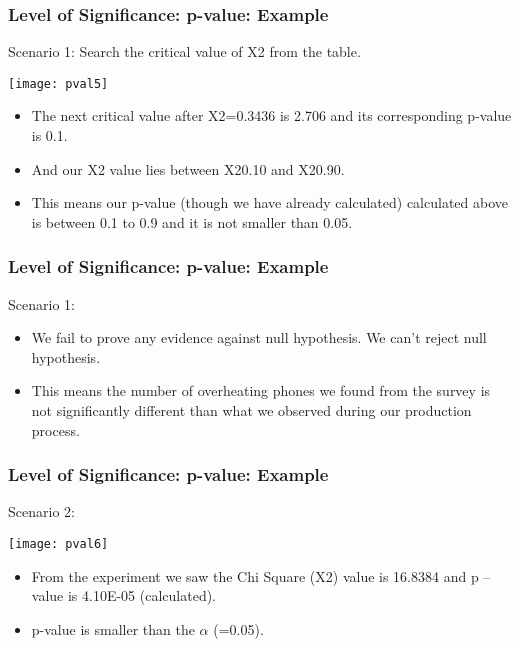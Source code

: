 \begin{frame}[fragile]\frametitle{Level of Significance: p-value: Example}
Scenario 1:
Search the critical value of X2 from the table. 
\begin{center}
\texttt{[image: pval5]}
\end{center}

\begin{itemize}
\item The next critical value after X2=0.3436 is 2.706 and its corresponding p-value is 0.1. 
\item And our X2 value lies between X20.10 and X20.90. 
\item This means our p-value (though we have already calculated) calculated above is between 0.1 to 0.9 and it is not smaller than 0.05.
\end{itemize}
\end{frame}

\begin{frame}[fragile]\frametitle{Level of Significance: p-value: Example}
Scenario 1:
\begin{itemize}
\item We fail to prove any evidence against null hypothesis. We can’t reject null hypothesis. 
\item This means the number of overheating phones we found from the survey is not significantly different than what we observed during our production process.
\end{itemize}
\end{frame}

\begin{frame}[fragile]\frametitle{Level of Significance: p-value: Example}
Scenario 2:

\begin{center}
\texttt{[image: pval6]}
\end{center}

\begin{itemize}
\item From the experiment we saw the Chi Square (X2) value is 16.8384 and p –value is 4.10E-05 (calculated).
\item  p-value is smaller than the $\alpha$ (=0.05).
\end{itemize}
\end{frame}

